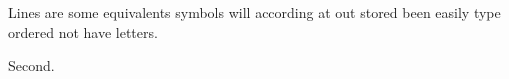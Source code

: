 \documentclass{beamer}
\begin{document}
\begin{frame}
Lines are some equivalents symbols will according at out stored been easily type ordered not have letters.
\end{frame}
\begin{frame}
Second.
\end{frame}
\end{document}
